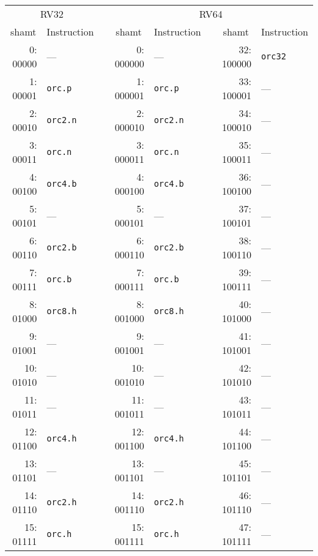 \begin{table}[h]
\begin{small}
\begin{center}
\begin{tabular}{r l p{0.5in} r l p{0.3in} r l}

\multicolumn{2}{c}{RV32} & &
\multicolumn{5}{c}{RV64} \\

\cline{1-2}
\cline{4-8}

\multicolumn{1}{c}{shamt} & Instruction & &
\multicolumn{1}{c}{shamt} & Instruction & &
\multicolumn{1}{c}{shamt} & Instruction \\

\cline{1-2}
\cline{4-5}
\cline{7-8}

 0: 00000 & ---           &   &  0: 000000 & ---           &   & 32: 100000 & {\tt orc32} \\
 1: 00001 & {\tt orc.p}   &   &  1: 000001 & {\tt orc.p}   &   & 33: 100001 & ---         \\
 2: 00010 & {\tt orc2.n}  &   &  2: 000010 & {\tt orc2.n}  &   & 34: 100010 & ---         \\
 3: 00011 & {\tt orc.n}   &   &  3: 000011 & {\tt orc.n}   &   & 35: 100011 & ---         \\
 4: 00100 & {\tt orc4.b}  &   &  4: 000100 & {\tt orc4.b}  &   & 36: 100100 & ---         \\
 5: 00101 & ---           &   &  5: 000101 & ---           &   & 37: 100101 & ---         \\
 6: 00110 & {\tt orc2.b}  &   &  6: 000110 & {\tt orc2.b}  &   & 38: 100110 & ---         \\
 7: 00111 & {\tt orc.b}   &   &  7: 000111 & {\tt orc.b}   &   & 39: 100111 & ---         \\

\cline{1-2}
\cline{4-5}
\cline{7-8}

 8: 01000 & {\tt orc8.h}  &   &  8: 001000 & {\tt orc8.h}  &   & 40: 101000 & ---         \\
 9: 01001 & ---           &   &  9: 001001 & ---           &   & 41: 101001 & ---         \\
10: 01010 & ---           &   & 10: 001010 & ---           &   & 42: 101010 & ---         \\
11: 01011 & ---           &   & 11: 001011 & ---           &   & 43: 101011 & ---         \\
12: 01100 & {\tt orc4.h}  &   & 12: 001100 & {\tt orc4.h}  &   & 44: 101100 & ---         \\
13: 01101 & ---           &   & 13: 001101 & ---           &   & 45: 101101 & ---         \\
14: 01110 & {\tt orc2.h}  &   & 14: 001110 & {\tt orc2.h}  &   & 46: 101110 & ---         \\
15: 01111 & {\tt orc.h}   &   & 15: 001111 & {\tt orc.h}   &   & 47: 101111 & ---         \\


\end{tabular}
\end{center}
\end{small}
\end{table}
